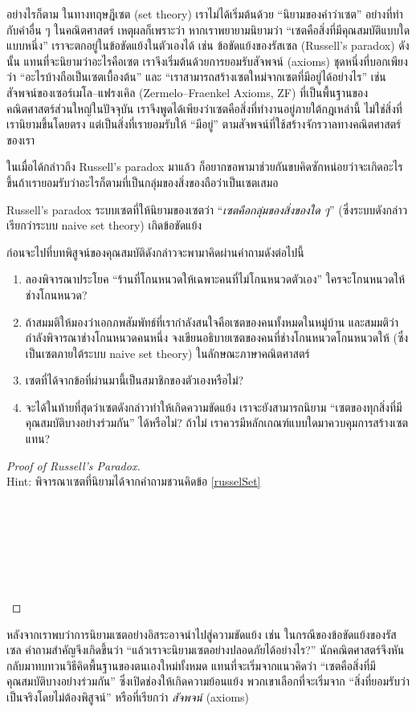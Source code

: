 อย่างไรก็ตาม ในทางทฤษฎีเซต (set theory) เราไม่ได้เริ่มต้นด้วย “นิยามของคำว่าเซต” อย่างที่ทำกับคำอื่น ๆ ในคณิตศาสตร์ เหตุผลก็เพราะว่า หากเราพยายามนิยามว่า “เซตคือสิ่งที่มีคุณสมบัติแบบใดแบบหนึ่ง” เราจะตกอยู่ในข้อขัดแย้งในตัวเองได้ เช่น ข้อขัดแย้งของรัสเซล (Russell's paradox) ดังนั้น แทนที่จะนิยามว่าอะไรคือเซต เราจึงเริ่มต้นด้วยการยอมรับสัจพจน์ (axioms) ชุดหนึ่งที่บอกเพียงว่า “อะไรบ้างถือเป็นเซตเบื้องต้น” และ “เราสามารถสร้างเซตใหม่จากเซตที่มีอยู่ได้อย่างไร” เช่น สัจพจน์ของเซอร์เมโล–แฟรงเคิล (Zermelo–Fraenkel Axioms, ZF) ที่เป็นพื้นฐานของคณิตศาสตร์ส่วนใหญ่ในปัจจุบัน เราจึงพูดได้เพียงว่าเซตคือสิ่งที่ทำงานอยู่ภายใต้กฎเหล่านี้ ไม่ใช่สิ่งที่เรานิยามขึ้นโดยตรง แต่เป็นสิ่งที่เรายอมรับให้ “มีอยู่” ตามสัจพจน์ที่ใช้สร้างจักรวาลทางคณิตศาสตร์ของเรา

ในเมื่อได้กล่าวถึง Russell's paradox มาแล้ว ก็อยากขอพามาช่วยกันขบคิดซักหน่อยว่าจะเกิดอะไรขึ้นถ้าเรายอมรับว่าอะไรก็ตามที่เป็นกลุ่มของสิ่งของถือว่าเป็นเซตเสมอ

\begin{prop}
	{Russell's paradox}{}
	ระบบเซตที่ให้นิยามของเซตว่า ``\textit{เซตคือกลุ่มของสิ่งของใด ๆ}'' (ซึ่งระบบดังกล่าวเรียกว่าระบบ naive set theory) เกิดข้อขัดแย้ง
\end{prop}
ก่อนจะไปที่บทพิสูจน์ของคุณสมบัติดังกล่าวจะพามาคิดผ่านคำถามดังต่อไปนี้
\begin{enumerate}
	\item ลองพิจารณาประโยค ``ร้านที่โกนหนวดให้เฉพาะคนที่ไม่โกนหนวดตัวเอง'' ใครจะโกนหนวดให้ช่างโกนหนวด?
	\item ถ้าสมมติให้มองว่าเอกภพสัมพัทธ์ที่เรากำลังสนใจคือเซตของคนทั้งหมดในหมู่บ้าน และสมมติว่ากำลังพิจารณาช่างโกนหนวดคนหนึ่ง จงเขียนอธิบายเซตของคนที่ช่างโกนหนวดโกนหนวดให้ (ซึ่งเป็นเซตภายใต้ระบบ naive set theory) ในลักษณะภาษาคณิตศาสตร์\label{russelSet}
	\item เซตที่ได้จากข้อที่ผ่านมานี้เป็นสมาชิกของตัวเองหรือไม่?
	\item จะได้ในท้ายที่สุดว่าเซตดังกล่าวทำให้เกิดความขัดแย้ง เราจะยังสามารถนิยาม “เซตของทุกสิ่งที่มีคุณสมบัติบางอย่างร่วมกัน” ได้หรือไม่? ถ้าไม่ เราควรมีหลักเกณฑ์แบบใดมาควบคุมการสร้างเซตแทน?
\end{enumerate}

\begin{proof}[Proof of Russell's Paradox]
	~\\Hint: พิจารณาเซตที่นิยามได้จากคำถามชวนคิดข้อ \ref{russelSet}
	~\\
	~\\
	~\\
	~\\
	~\\
	~\\
	~\\
	~\\
\end{proof}
\newpage
หลังจากเราพบว่าการนิยามเซตอย่างอิสระอาจนำไปสู่ความขัดแย้ง เช่น ในกรณีของข้อขัดแย้งของรัสเซล คำถามสำคัญจึงเกิดขึ้นว่า “แล้วเราจะนิยามเซตอย่างปลอดภัยได้อย่างไร?” นักคณิตศาสตร์จึงหันกลับมาทบทวนวิธีคิดพื้นฐานของตนเองใหม่ทั้งหมด แทนที่จะเริ่มจากแนวคิดว่า “เซตคือสิ่งที่มีคุณสมบัติบางอย่างร่วมกัน” ซึ่งเปิดช่องให้เกิดความย้อนแย้ง พวกเขาเลือกที่จะเริ่มจาก “สิ่งที่ยอมรับว่าเป็นจริงโดยไม่ต้องพิสูจน์” หรือที่เรียกว่า \textit{สัจพจน์} (axioms)

